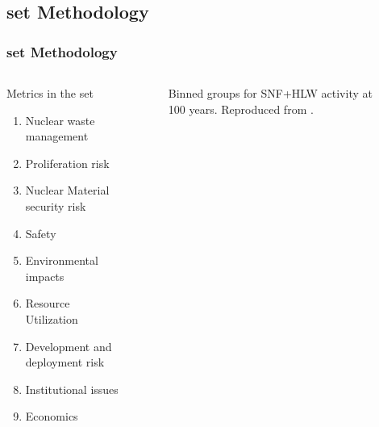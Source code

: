 \subsection{\gls{set} Methodology}
\begin{frame}
    \frametitle{\gls{set} Methodology}
    \begin{columns}
        \column[t]{3.5cm}
        \begin{block}{Metrics in the \gls{set}}
            \begin{enumerate}
                \item Nuclear waste management
                \item Proliferation risk
                \item Nuclear Material security risk
                \item Safety
                \item Environmental impacts
                \item Resource Utilization
                \item Development and deployment risk
                \item Institutional issues
                \item Economics
            \end{enumerate}        
        \end{block}
        \column[t]{6.5cm}
          \begin{figure}[htbp!]
            \begin{center}
            \resizebox{\columnwidth}{!}{}
            \end{center}
                \caption{Binned groups for SNF+HLW activity at 100 years. Reproduced from \cite{wigeland_nuclear_2014}.}
            \label{fig:set_activity_bin}
        \end{figure}
    \end{columns}
\end{frame}


